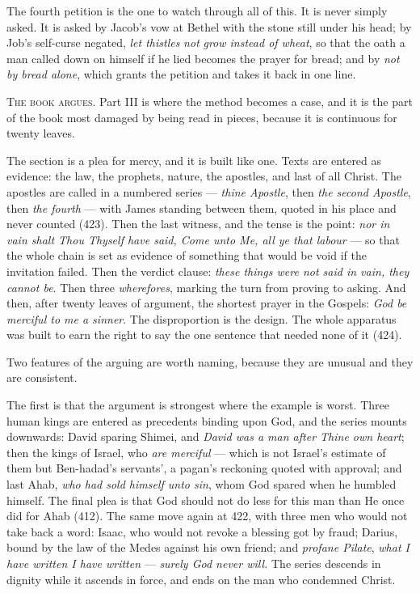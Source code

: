 The fourth petition is the one to watch through all of this. It is never simply
asked. It is asked by Jacob's vow at Bethel with the stone still under his head; by
Job's self-curse negated, \emph{let thistles} \emph{not} \emph{grow instead of
wheat}, so that the oath a man called down on himself if he lied becomes the prayer
for bread; and by \emph{not by bread alone}, which grants the petition and takes it
back in one line.

\vspace{0.8\baselineskip}
{\scshape The book argues.}\quad
Part III is where the method becomes a case, and it is the part of the book most
damaged by being read in pieces, because it is continuous for twenty leaves.

The section is a plea for mercy, and it is built like one. Texts are entered as
evidence: the law, the prophets, nature, the apostles, and last of all Christ. The
apostles are called in a numbered series --- \emph{thine Apostle}, then \emph{the
second Apostle}, then \emph{the fourth} --- with James standing between them,
quoted in his place and never counted (423). Then the last witness, and the tense
is the point: \emph{nor in vain shalt Thou Thyself have said, Come unto Me, all ye
that labour} --- so that the whole chain is set as evidence of something that would
be void if the invitation failed. Then the verdict clause: \emph{these things were
not said in vain, they cannot be}. Then three \emph{wherefores}, marking the turn
from proving to asking. And then, after twenty leaves of argument, the shortest
prayer in the Gospels: \emph{God be merciful to me a sinner}. The disproportion is
the design. The whole apparatus was built to earn the right to say the one sentence
that needed none of it (424).

Two features of the arguing are worth naming, because they are unusual and they are
consistent.

The first is that the argument is strongest where the example is worst. Three human
kings are entered as precedents binding upon God, and the series mounts downwards:
David sparing Shimei, and \emph{David was a man after Thine own heart}; then the
kings of Israel, who \emph{are merciful} --- which is not Israel's estimate of them
but Ben-hadad's servants', a pagan's reckoning quoted with approval; and last Ahab,
\emph{who had sold himself unto sin}, whom God spared when he humbled himself. The
final plea is that God should not do less for this man than He once did for Ahab
(412). The same move again at 422, with three men who would not take back a word:
Isaac, who would not revoke a blessing got by fraud; Darius, bound by the law of
the Medes against his own friend; and \emph{profane Pilate}, \emph{what I have
written I have written} --- \emph{surely God never will.} The series descends in
dignity while it ascends in force, and ends on the man who condemned Christ.

